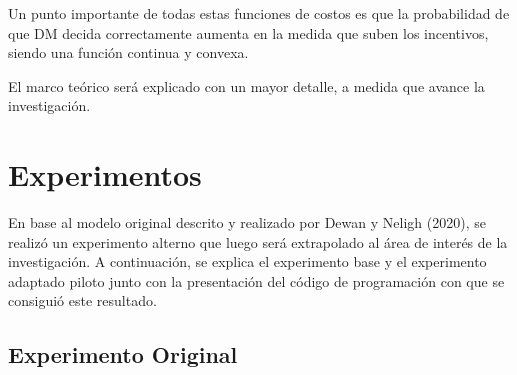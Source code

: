 \documentclass[11pt,letterpaper]{article}
\begin{document}
Un punto importante de todas estas funciones de costos es que la probabilidad de que DM decida correctamente aumenta en la medida que suben los incentivos, siendo una función continua y convexa. 

El marco teórico será explicado con un mayor detalle, a medida que avance la investigación.

\section{Experimentos}

En base al modelo original descrito y realizado por Dewan y Neligh (2020), se realizó un experimento alterno que luego será extrapolado al área de interés de la investigación. A continuación, se explica el experimento base y el experimento adaptado piloto junto con la presentación del código de programación con que se consiguió este resultado.

\subsection{Experimento Original}
\end{document}
